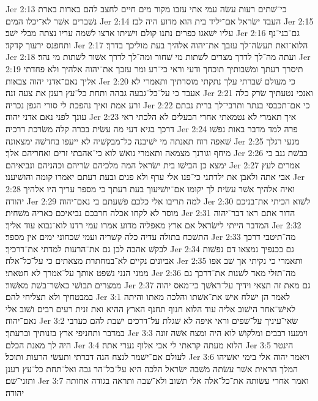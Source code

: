 Jer 2:13  כי־שׁתים רעות עשׂה עמי אתי עזבו מקור מים חיים לחצב להם בארות בארת נשׁברים אשׁר לא־יכלו המים׃
Jer 2:14  העבד ישׂראל אם־יליד בית הוא מדוע היה לבז׃
Jer 2:15  עליו ישׁאגו כפרים נתנו קולם וישׁיתו ארצו לשׁמה עריו נצתה מבלי ישׁב׃
Jer 2:16  גם־בני־נף ותחפנס ירעוך קדקד׃
Jer 2:17  הלוא־זאת תעשׂה־לך עזבך את־יהוה אלהיך בעת מוליכך בדרך׃
Jer 2:18  ועתה מה־לך לדרך מצרים לשׁתות מי שׁחור ומה־לך לדרך אשׁור לשׁתות מי נהר׃
Jer 2:19  תיסרך רעתך ומשׁבותיך תוכחך ודעי וראי כי־רע ומר עזבך את־יהוה אלהיך ולא פחדתי אליך נאם־אדני יהוה צבאות׃
Jer 2:20  כי מעולם שׁברתי עלך נתקתי מוסרתיך ותאמרי לא אעבד כי על־כל־גבעה גבהה ותחת כל־עץ רענן את צעה זנה׃
Jer 2:21  ואנכי נטעתיך שׂרק כלה זרע אמת ואיך נהפכת לי סורי הגפן נכריה׃
Jer 2:22  כי אם־תכבסי בנתר ותרבי־לך ברית נכתם עונך לפני נאם אדני יהוה׃
Jer 2:23  איך תאמרי לא נטמאתי אחרי הבעלים לא הלכתי ראי דרכך בגיא דעי מה עשׂית בכרה קלה משׂרכת דרכיה׃
Jer 2:24  פרה למד מדבר באות נפשׁו שׁאפה רוח תאנתה מי ישׁיבנה כל־מבקשׁיה לא ייעפו בחדשׁה ימצאונה׃
Jer 2:25  מנעי רגלך מיחף וגורנך מצמאה ותאמרי נואשׁ לוא כי־אהבתי זרים ואחריהם אלך׃
Jer 2:26  כבשׁת גנב כי ימצא כן הבישׁו בית ישׂראל המה מלכיהם שׂריהם וכהניהם ונביאיהם׃
Jer 2:27  אמרים לעץ אבי אתה ולאבן את ילדתני כי־פנו אלי ערף ולא פנים ובעת רעתם יאמרו קומה והושׁיענו׃
Jer 2:28  ואיה אלהיך אשׁר עשׂית לך יקומו אם־יושׁיעוך בעת רעתך כי מספר עריך היו אלהיך יהודה׃
Jer 2:29  למה תריבו אלי כלכם פשׁעתם בי נאם־יהוה׃
Jer 2:30  לשׁוא הכיתי את־בניכם מוסר לא לקחו אכלה חרבכם נביאיכם כאריה משׁחית׃
Jer 2:31  הדור אתם ראו דבר־יהוה המדבר הייתי לישׂראל אם ארץ מאפליה מדוע אמרו עמי רדנו לוא־נבוא עוד אליך׃
Jer 2:32  התשׁכח בתולה עדיה כלה קשׁריה ועמי שׁכחוני ימים אין מספר׃
Jer 2:33  מה־תיטבי דרכך לבקשׁ אהבה לכן גם את־הרעות למדתי את־דרכיך׃
Jer 2:34  גם בכנפיך נמצאו דם נפשׁות אביונים נקיים לא־במחתרת מצאתים כי על־כל־אלה׃
Jer 2:35  ותאמרי כי נקיתי אך שׁב אפו ממני הנני נשׁפט אותך על־אמרך לא חטאתי׃
Jer 2:36  מה־תזלי מאד לשׁנות את־דרכך גם ממצרים תבושׁי כאשׁר־בשׁת מאשׁור׃
Jer 2:37  גם מאת זה תצאי וידיך על־ראשׁך כי־מאס יהוה במבטחיך ולא תצליחי להם׃
Jer 3:1  לאמר הן ישׁלח אישׁ את־אשׁתו והלכה מאתו והיתה לאישׁ־אחר הישׁוב אליה עוד הלוא חנוף תחנף הארץ ההיא ואת זנית רעים רבים ושׁוב אלי נאם־יהוה׃
Jer 3:2  שׂאי־עיניך על־שׁפים וראי איפה לא שׁגלת על־דרכים ישׁבת להם כערבי במדבר ותחניפי ארץ בזנותיך וברעתך׃
Jer 3:3  וימנעו רבבים ומלקושׁ לוא היה ומצח אשׁה זונה היה לך מאנת הכלם׃
Jer 3:4  הלוא מעתה קראתי לי אבי אלוף נערי אתה׃
Jer 3:5  הינטר לעולם אם־ישׁמר לנצח הנה דברתי ותעשׂי הרעות ותוכל׃
Jer 3:6  ויאמר יהוה אלי בימי יאשׁיהו המלך הראית אשׁר עשׂתה משׁבה ישׂראל הלכה היא על־כל־הר גבה ואל־תחת כל־עץ רענן ותזני־שׁם׃
Jer 3:7  ואמר אחרי עשׂותה את־כל־אלה אלי תשׁוב ולא־שׁבה ותראה בגודה אחותה יהודה׃
